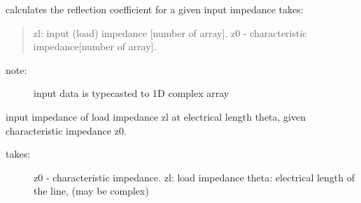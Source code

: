 \documentclass[letterpaper,10pt,english]{sphinxmanual}
\begin{document}

\begin{fulllineitems}
\label{api/mwavepy:mwavepy.tlineFunctions.input_impedance_2_reflection_coefficient}
calculates the reflection coefficient for a given input impedance 
takes:
\begin{quote}

zl: input (load) impedance {[}number of array{]}.  
z0 - characteristic impedance{[}number of array{]}.
\end{quote}
\begin{description}
\item[{note:}] \leavevmode
input data is typecasted to 1D complex array

\end{description}

\end{fulllineitems}


\begin{fulllineitems}
\label{api/mwavepy:mwavepy.tlineFunctions.input_impedance_2_reflection_coefficient_at_theta}
\end{fulllineitems}


\begin{fulllineitems}
\label{api/mwavepy:mwavepy.tlineFunctions.input_impedance_at_theta}
input impedance of load impedance zl at electrical length theta, 
given characteristic impedance z0.
\begin{description}
\item[{takes:}] \leavevmode
z0 - characteristic impedance. 
zl: load impedance
theta: electrical length of the line, (may be complex)

\end{description}

\end{fulllineitems}
\end{document}
